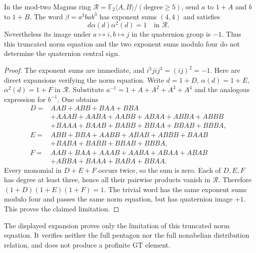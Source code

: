 \begin{proposition}
\label{prop:truncated-counterexample}
In the mod-two Magnus ring
$\mathcal R=\mathbb F_2\langle A,B\rangle/(\text{degree}\ge5)$,
send $a$ to $1+A$ and $b$ to $1+B$.
The word $\beta=a^3bab^3$ has exponent sums $(4,4)$ and
satisfies
\[
 d\alpha(d)\alpha^2(d)=1\quad\text{in }\mathcal R.
\]
Nevertheless its image under $a\mapsto i,b\mapsto j$ in the
quaternion group is $-1$.  Thus this truncated norm equation
and the two exponent sums modulo four do not determine the
quaternion central sign.
\end{proposition}
\begin{proof}
The exponent sums are immediate, and
$i^3jij^3=(ij)^2=-1$.
Here are direct expansions verifying the norm equation.  Write
$d=1+D$, $\alpha(d)=1+E$, $\alpha^2(d)=1+F$ in $\mathcal R$.
Substitute $a^{-1}=1+A+A^2+A^3+A^4$ and the analogous
expression for $b^{-1}$.  One obtains
\[
\begin{split}
D={}&AAB+ABB+BAA+BBA\\
 &+AAAB+AABA+AABB+ABAA+ABBA+ABBB\\
 &+BAAA+BAAB+BABB+BBAA+BBAB+BBBA,\\
E={}&ABB+BBA+AABB+ABAB+ABBB+BAAB\\
 &+BABA+BABB+BBAB+BBBA,\\
F={}&AAB+BAA+AAAB+AABA+ABAA+ABAB\\
 &+ABBA+BAAA+BABA+BBAA.
\end{split}
\]
Every monomial in $D+E+F$ occurs twice, so the sum is zero.
Each of $D,E,F$ has degree at least three, hence all their
pairwise products vanish in $\mathcal R$.  Therefore
$(1+D)(1+E)(1+F)=1$.
The trivial word has the same exponent sums modulo four
and passes the same norm equation, but has quaternion image
$+1$.  This proves the claimed limitation.
\end{proof}

The displayed expansion proves only the limitation of this truncated
norm equation.  It verifies neither the full pentagon nor the full
nonabelian distribution relation, and does not produce a profinite
GT element.




